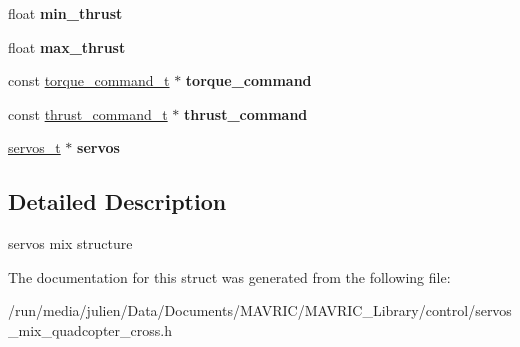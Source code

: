 \begin{DoxyCompactItemize}
\item 
\hypertarget{structservo__mix__quadcotper__cross__t_a32f412070596c136cc4d5c005370a1d7}{float {\bfseries min\+\_\+thrust}}\label{structservo__mix__quadcotper__cross__t_a32f412070596c136cc4d5c005370a1d7}

\item 
\hypertarget{structservo__mix__quadcotper__cross__t_a57b8ccc0eec0500f0d4814ab97055737}{float {\bfseries max\+\_\+thrust}}\label{structservo__mix__quadcotper__cross__t_a57b8ccc0eec0500f0d4814ab97055737}

\item 
\hypertarget{structservo__mix__quadcotper__cross__t_aa10b72d6ae264e71c26d2aa08197fed6}{const \hyperlink{structtorque__command__t}{torque\+\_\+command\+\_\+t} $\ast$ {\bfseries torque\+\_\+command}}\label{structservo__mix__quadcotper__cross__t_aa10b72d6ae264e71c26d2aa08197fed6}

\item 
\hypertarget{structservo__mix__quadcotper__cross__t_a0df6a0d93cb33d2dd0fde624719cd604}{const \hyperlink{structthrust__command__t}{thrust\+\_\+command\+\_\+t} $\ast$ {\bfseries thrust\+\_\+command}}\label{structservo__mix__quadcotper__cross__t_a0df6a0d93cb33d2dd0fde624719cd604}

\item 
\hypertarget{structservo__mix__quadcotper__cross__t_ae35fdaf5786cc00fbe3fa0810d25bb5d}{\hyperlink{structservos__t}{servos\+\_\+t} $\ast$ {\bfseries servos}}\label{structservo__mix__quadcotper__cross__t_ae35fdaf5786cc00fbe3fa0810d25bb5d}

\end{DoxyCompactItemize}


\subsection{Detailed Description}
servos mix structure 

The documentation for this struct was generated from the following file\+:\begin{DoxyCompactItemize}
\item 
/run/media/julien/\+Data/\+Documents/\+M\+A\+V\+R\+I\+C/\+M\+A\+V\+R\+I\+C\+\_\+\+Library/control/servos\+\_\+mix\+\_\+quadcopter\+\_\+cross.\+h\end{DoxyCompactItemize}
